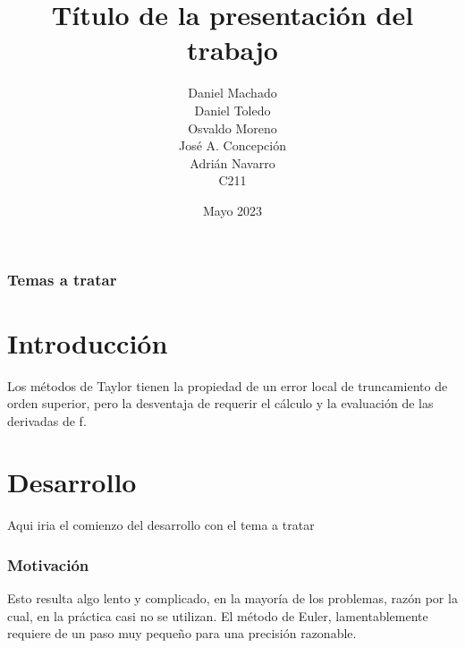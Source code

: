 \documentclass{beamer}
\title[Título del trabajo]{Título de la presentación del trabajo}
\author[Machado, Toledo, Moreno, Concepción, Navarro]
		{
			Daniel Machado \\
			Daniel Toledo \\
			Osvaldo Moreno \\
			José A. Concepción \\
			Adrián Navarro \\
			{\small C211}
		}
\date{Mayo 2023}
\begin{document}

\begin{frame}
	\frametitle{Temas a tratar} 
	\tableofcontents 
\end{frame}

\section{Introducci\'on}
\begin{frame}
\begin{minipage}{10cm}
	Los m\'etodos de Taylor tienen la propiedad de un error local de truncamiento de orden superior, pero la desventaja de requerir el c\'alculo y la evaluaci\'on de las derivadas de f.
\end{minipage}
\end{frame}

\section{Desarrollo}
\begin{frame}
\begin{minipage}{10cm}
	Aqui iria el comienzo del desarrollo con el tema a tratar
\end{minipage}
\end{frame}

\begin{frame}
\frametitle{Motivaci\'on}
\begin{minipage}{10cm}
Esto resulta algo lento y complicado, en la mayor\'ia de los problemas, raz\'on por la cual, en la pr\'actica casi no se utilizan. El método de Euler, lamentablemente requiere de un paso muy pequeño para una precisi\'on razonable. 
\end{minipage}
\end{frame}	
\end{document}
